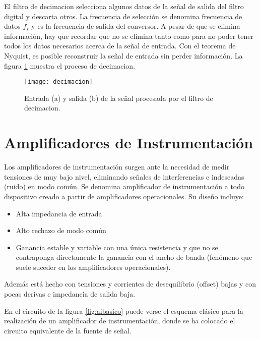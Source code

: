 El filtro de decimacion selecciona algunos datos de la señal de salida del filtro digital y descarta otros. La frecuencia de selección se denomina frecuencia de datos $f_s$ y es la frecuencia de salida del conversor. A pesar de que se elimina información, hay que recordar que no se elimina tanto como para no poder tener todos los datos necesarios acerca de la señal de entrada. Con el teorema de Nyquist\cite{shannon}, es posible reconstruir la señal de entrada sin perder información. La figura \ref{fig:decimacion} muestra el proceso de decimacion.\cite{delta_sigma_2} %

\begin{figure}[h]
  \centering
  \texttt{[image: decimacion]}
  \caption{Entrada (a) y salida (b) de la señal procesada por el filtro de decimacion. }\label{fig:decimacion}
\end{figure} 




\section{Amplificadores de Instrumentación} %
\label{sec:amplificadores_de_instrumentacion}

Los amplificadores de instrumentación surgen ante la necesidad de medir tensiones de muy bajo nivel, eliminando señales de interferencias e indeseadas (ruido) en modo común.
Se denomina amplificador de instrumentación a todo dispositivo creado a partir de amplificadores operacionales. Su diseño incluye:

\begin{itemize}
	\item Alta impedancia de entrada
    \item Alto rechazo de modo común
    \item Ganancia estable y variable con una única resistencia y que no se contraponga directamente la ganancia con el ancho de banda (fenómeno que suele suceder en los amplificadores operacionales).
\end{itemize}

Además está hecho con tensiones y corrientes de desequilibrio (offset) bajas y con pocas derivas e impedancia de salida baja.

En el circuito de la figura \ref{fig:aibasico} puede verse el esquema clásico para la realización de un amplificador de instrumentación, donde se ha colocado el circuito equivalente de la fuente de señal.

